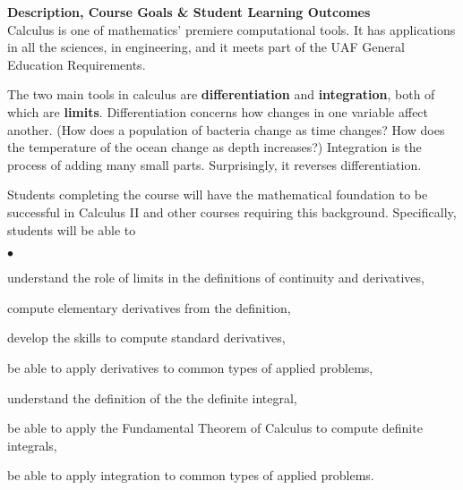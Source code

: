 \documentclass[12pt]{article}
\renewcommand{\emph}[1]{\textsf{\textbf{#1}}}
\newcommand{\localhead}[1]{\par\smallskip\textbf{#1}\nobreak\\}%
\def\heading#1{\localhead{\large\emph{#1}}}
\newenvironment{clist}%
{\bgroup\parskip 0pt\begin{list}{$\bullet$}{\partopsep 4pt\topsep 0pt\itemsep -2pt}}%
{\end{list}\egroup}%
\begin{document}
\heading{Description, Course Goals \& Student Learning Outcomes}
Calculus is one of mathematics' premiere computational tools.
It has applications in all the sciences, in engineering, and it meets 
part of the UAF General Education Requirements.

The two main tools in calculus are \emph{differentiation} and \emph{integration}, both of which are \emph{limits}.  Differentiation concerns how changes in one variable affect another.  (How does a population of bacteria change as time changes?  How does the temperature of the ocean change as depth increases?)  Integration is the process of adding many small parts.  Surprisingly, it reverses differentiation.

Students completing the course will have the mathematical foundation to be successful in Calculus II and other courses
requiring this background.  Specifically, students will be able to

\begin{clist}
\item understand the role of limits in the definitions of continuity and derivatives,
\item compute elementary derivatives from the definition,
\item develop the skills to compute standard derivatives,
\item be able to apply derivatives to common types of applied problems,
\item understand the definition of the the definite integral,
\item be able to apply the Fundamental Theorem of Calculus to
compute definite integrals,
\item be able to apply integration to common types of applied problems.
\end{clist}
\end{document}
